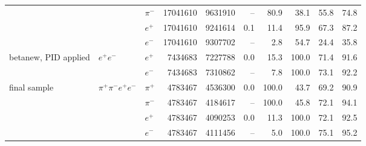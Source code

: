 \begin{table}[H]
\begin{tabular}{@{}l l l r r r r r r r@{}}
 &  & $\pi^-$ & 17041610 & 9631910 & -- & 80.9 & 38.1 & 55.8 & 74.8 \\
 &  & $e^+$ & 17041610 & 9241614 & 0.1 & 11.4 & 95.9 & 67.3 & 87.2 \\
 &  & $e^-$ & 17041610 & 9307702 & -- & 2.8 & 54.7 & 24.4 & 35.8 \\
\midrule
betanew, PID applied & $e^+e^-$ & $e^+$ & 7434683 & 7227788 & 0.0 & 15.3 & 100.0 & 71.4 & 91.6 \\
 &  & $e^-$ & 7434683 & 7310862 & -- & 7.8 & 100.0 & 73.1 & 92.2 \\
\midrule
final sample & $\pi^+\pi^-e^+e^-$ & $\pi^+$ & 4783467 & 4536300 & 0.0 & 100.0 & 43.7 & 69.2 & 90.9 \\
 &  & $\pi^-$ & 4783467 & 4184617 & -- & 100.0 & 45.8 & 72.1 & 94.1 \\
 &  & $e^+$ & 4783467 & 4090253 & 0.0 & 11.3 & 100.0 & 72.1 & 92.5 \\
 &  & $e^-$ & 4783467 & 4111456 & -- & 5.0 & 100.0 & 75.1 & 95.2 \\
\bottomrule
\end{tabular}
\end{table}
